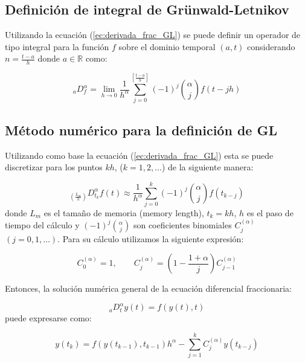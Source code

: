 \documentclass[10pt,a4paper]{article}
\begin{document}
		\subsection{Definición de integral de Grünwald-Letnikov}
		
	Utilizando la ecuación (\ref{ec:derivada_frac_GL}) se puede definir un operador de tipo integral para la función $f$  sobre el dominio temporal $(a,t)$ considerando $n = \frac{t-a}{h}$ donde $a \in \mathbb{R}$ como:
			
	\begin{equation}
		_{a}D_{f}^{\alpha} = \lim_{h \to 0 } \frac{1}{h^{\alpha}} \sum_{j = 0}^{\left[ \frac{t-a}{h}  \right]} (-1)^{j} \binom{\alpha}{j} f(t - jh)
	\end{equation}

		\subsection{Método numérico para la definición de GL}
		
	Utilizando como base la ecuación (\ref{ec:derivada_frac_GL}) esta se puede discretizar para los puntos $kh$, ($k = 1,2,\ldots$) de la siguiente manera:
			
	\begin{equation}
		_{\left( \frac{L_{m}}{h} \right)} D^{\alpha}_{t_{k}} f(t) \approx \frac{1}{h^{\alpha}} \sum_{j=0}^{k}(-1)^{j}  \binom{\alpha}{j} f(t_{k-j})
	\end{equation}
	donde $L_{m}$ es el tamaño de memoria (memory length), $t_{k} = kh$, $h$ es el paso de tiempo del cálculo y $(-1)^{j}\binom{\alpha}{j}$ son coeficientes binomiales $C_{j}^{(\alpha)}$ $(j=0,1,\ldots)$. Para su cálculo utilizamos la siguiente expresión:
		
	\begin{equation}
		C_{0}^{(\alpha)} = 1, \qquad  C_{j}^{(\alpha)} = \left( 1 - \frac{1 + \alpha}{j} \right) C_{j-1}^{(\alpha)}
	\end{equation}
			
	Entonces, la solución numérica general de la ecuación diferencial fraccionaria:
		
	\begin{equation}
	 	_{a}D^{\alpha}_{t} y(t) = f(y(t), t)
	\end{equation}
	puede expresarse como:
		
	\begin{equation}
		y(t_{k}) = f(y(t_{k-1}), t_{k-1}) h^{\alpha} - \sum_{j=1}^{k} C_{j}^{(\alpha)} y(t_{k-j})
		\label{ec:GL_numerico}
	\end{equation}
\end{document}

